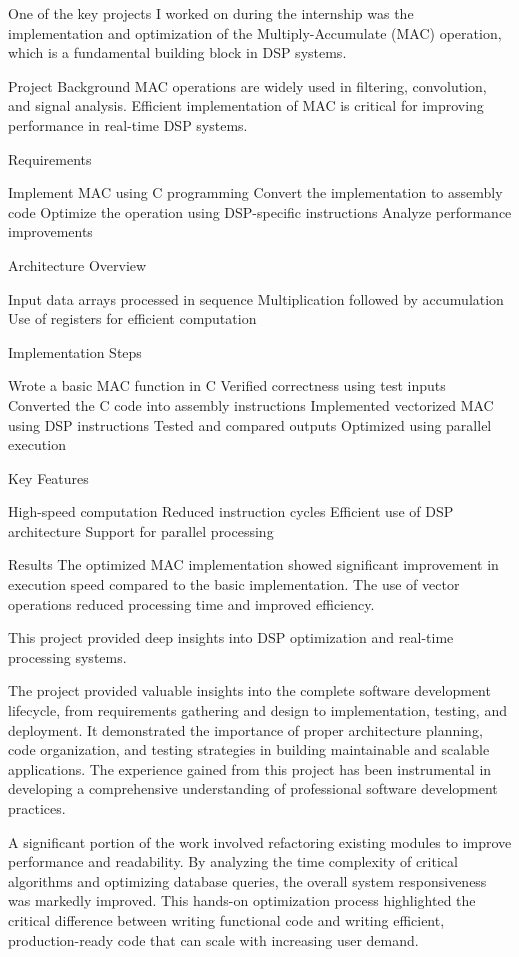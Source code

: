 \documentclass[12pt,a4paper]{report}
\begin{document}
One of the key projects I worked on during the internship was the implementation and optimization of the Multiply-Accumulate (MAC) operation, which is a fundamental building block in DSP systems.


Project Background MAC operations are widely used in filtering, convolution, and signal analysis. Efficient implementation of MAC is critical for improving performance in real-time DSP systems.


Requirements


Implement MAC using C programming Convert the implementation to assembly code Optimize the operation using DSP-specific instructions Analyze performance improvements


Architecture Overview


Input data arrays processed in sequence Multiplication followed by accumulation Use of registers for efficient computation


Implementation Steps


Wrote a basic MAC function in C Verified correctness using test inputs Converted the C code into assembly instructions Implemented vectorized MAC using DSP instructions Tested and compared outputs Optimized using parallel execution


Key Features


High-speed computation Reduced instruction cycles Efficient use of DSP architecture Support for parallel processing


Results The optimized MAC implementation showed significant improvement in execution speed compared to the basic implementation. The use of vector operations reduced processing time and improved efficiency.


This project provided deep insights into DSP optimization and real-time processing systems.


The project provided valuable insights into the complete software development lifecycle, from requirements gathering and design to implementation, testing, and deployment. It demonstrated the importance of proper architecture planning, code organization, and testing strategies in building maintainable and scalable applications. The experience gained from this project has been instrumental in developing a comprehensive understanding of professional software development practices.


A significant portion of the work involved refactoring existing modules to improve performance and readability. By analyzing the time complexity of critical algorithms and optimizing database queries, the overall system responsiveness was markedly improved. This hands-on optimization process highlighted the critical difference between writing functional code and writing efficient, production-ready code that can scale with increasing user demand.
\end{document}
